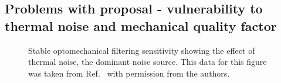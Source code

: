 



\subsection{Problems with proposal - vulnerability to thermal noise and mechanical quality factor}

\begin{figure}
	\centering
	\caption{Stable optomechanical filtering sensitivity showing the effect of thermal noise, the dominant noise source. This data for this figure was taken from Ref.~\cite{} with permission from the authors.}
	\label{fig:}
\end{figure}


